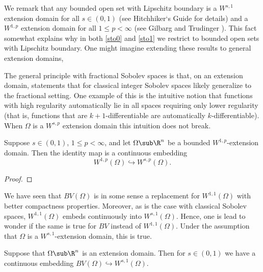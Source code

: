 \documentclass[../main.tex]{subfiles}
\begin{document}
We remark that any bounded open set with Lipschitz boundary is a $ W^{s,1} $ extension domain for all $ s\in (0,1) $ (see Hitchhiker`s Guide \cite{hitchhiker} for details) and a $ W^{1,p} $ extension domain for all $ 1\leq p <\infty $ (see Gilbarg and Trudinger \cite[Thm.~7.25]{}). This fact somewhat explains why in both \ref{sto0} and \ref{sto1} we restrict to bounded open sets with Lipschitz boundary. One might imagine extending these results to general extension domains,

The general principle with fractional Sobolev spaces is that, on an extension domain, statements that for classical integer Sobolev spaces likely generalize to the fractional setting. One example of this is the intuitive notion that functions with high regularity automatically lie in all spaces requiring only lower regularity (that is, functions that are $ k+1 $-differentiable are automatically $ k $-differentiable). When $ \Omega $ is a $ W^{s,p} $ extension domain this intuition does not break.

\begin{proposition}\label{highertolower}
    Suppose $ s\in (0,1) $, $ 1\leq p <\infty $, and let $ \Omega\sub \R^{n} $ be a bounded $ W^{1,p} $-extension domain. Then the identity map is a continuous embedding 
    \[
        W^{1,p}(\Omega)\hookrightarrow W^{s,p}(\Omega).
    \]
\end{proposition}

\begin{proof}
    
\end{proof}

We have seen that $ BV(\Omega) $ is in some sense a replacement for $ W^{1,1}(\Omega) $ with better compactness properties. Moreover, as is the case with classical Sobolev spaces, $ W^{1,1}(\Omega) $ embeds continuously into $ W^{s,1}(\Omega) $. Hence, one is lead to wonder if the same is true for $ BV $ instead of $ W^{1,1}(\Omega) $. Under the assumption that $ \Omega $ is a $ W^{s,1} $-extension domain, this is true.


\begin{proposition}\label{BVinWs}
    Suppose that $ \Omega\sub \R^{n} $ is an extension domain. Then for $ s\in (0,1) $ we have a continuous embedding $ BV(\Omega)\hookrightarrow W^{s,1}(\Omega) $. 
\end{proposition}
\end{document}
